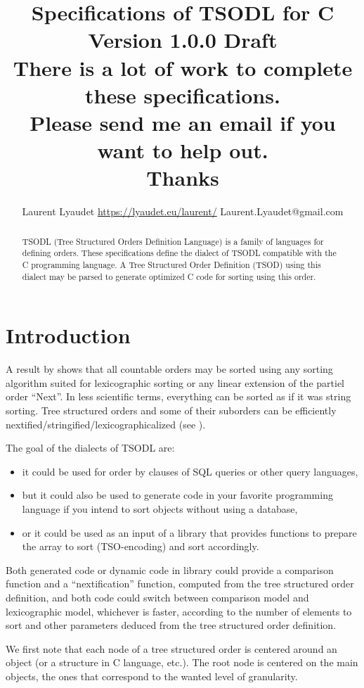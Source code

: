 \documentclass[a4paper,11pt]{report}
\author{Laurent Lyaudet \url{https://lyaudet.eu/laurent/} Laurent.Lyaudet@gmail.com}
\title{
  Specifications of TSODL for C\\
  Version 1.0.0 Draft\\
  There is a lot of work to complete these specifications.\\
  Please send me an email if you want to help out.\\
  Thanks
}
\begin{document}
\maketitle

\begin{abstract}
TSODL (Tree Structured Orders Definition Language) is a family of languages for defining orders.
These specifications define the dialect of TSODL compatible with the C programming language.
A Tree Structured Order Definition (TSOD) using this dialect
may be parsed to generate optimized C code for sorting using this order.
\end{abstract}

\tableofcontents

\chapter{Introduction}
\label{chapter:introduction}

A result by \cite{Cantor1895} shows that all countable orders may be sorted using any sorting algorithm suited
for lexicographic sorting or any linear extension of the partiel order ``Next''.
In less scientific terms, everything can be sorted as if it was string sorting.
Tree structured orders and some of their suborders can be efficiently
nextified/stringified/lexicographicalized (see \cite{DBLP:journals/corr/abs-1809-00954}).

The goal of the dialects of TSODL are:
\begin{itemize}
\item it could be used for order by clauses of SQL queries or other query languages,
\item but it could also be used to generate code in your favorite programming language if you intend to sort objects without using a database,
\item or it could be used as an input of a library that provides functions to prepare the array to sort (TSO-encoding) and sort accordingly.
\end{itemize}
Both generated code or dynamic code in library could provide a comparison function and a ``nextification'' function,
computed from the tree structured order definition,
and both code could switch between comparison model and lexicographic model, whichever is faster,
according to the number of elements to sort and other parameters deduced from the tree structured order definition.

We first note that each node of a tree structured order is centered around an object (or a structure in C language, etc.).
The root node is centered on the main objects, the ones that correspond to the wanted level of granularity.
\end{document}
